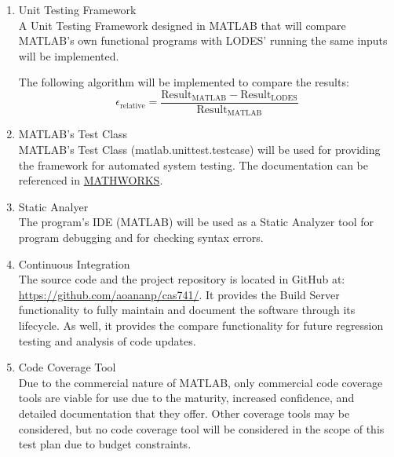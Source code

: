 \documentclass[12pt, titlepage]{article}
\newcommand{\famname}{LODES} %
\newcommand{\famurl}{https://github.com/aoananp/cas741/}
\newcommand{\unittesturl}{https://www.mathworks.com/help/matlab/matlab_prog/author-class-based-unit-tests-
in-matlab.html}
\begin{document}
\begin{enumerate}
\item{Unit Testing Framework\\}
A Unit Testing Framework designed in MATLAB that will compare MATLAB's own functional programs
with \famname{}' running the same inputs will be implemented.

The following algorithm  will be implemented to
compare the results:
$$\epsilon_{\text{relative}} = \frac{\text{Result}_\text{MATLAB} - \text{Result}_\text{\famname{}}} {\text{Result}
_\text{MATLAB}} $$


\item{MATLAB's Test Class\\}
MATLAB's Test Class (matlab.unittest.testcase) will be used for providing the framework for automated
system testing. The documentation can be referenced in \href{\unittesturl}{MATHWORKS}.

\item{Static Analyer\\} 
The program's IDE (MATLAB) will be used as a Static Analyzer tool for program debugging and
for checking syntax errors.

\item{Continuous Integration\\}
The source code and the project repository is located in GitHub at: \url{\famurl}.
It provides the Build Server functionality to fully maintain and document the software through its lifecycle.
As well, it provides the compare functionality for future regression testing and
analysis of code updates.  

\item{Code Coverage Tool\\}
Due to the commercial nature of MATLAB, only commercial code coverage tools are viable for use due to the 
maturity, increased confidence, and detailed documentation that they offer. Other coverage tools may be 
considered, but no code coverage tool will be considered in the scope of this
test plan due to budget constraints. 

\end{enumerate}
\end{document}
